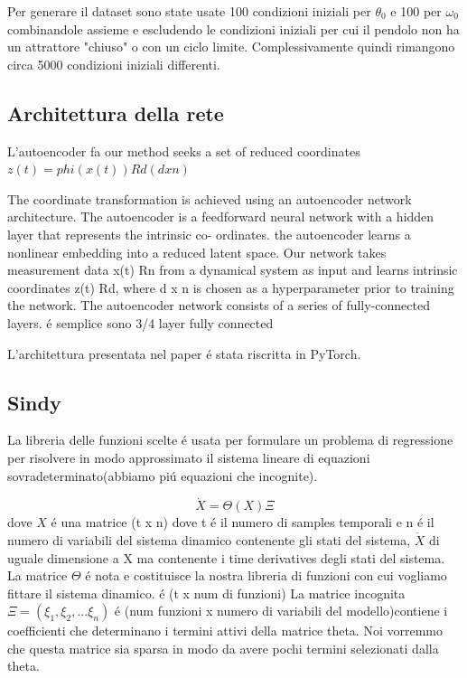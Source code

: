 \documentclass[11pt]{article}
\begin{document}
Per generare il dataset sono state usate 100 condizioni iniziali per $\theta_0$ e 100 per $\omega_0$ combinandole assieme e escludendo le condizioni iniziali per cui il pendolo non ha un attrattore "chiuso" o con un ciclo limite. Complessivamente quindi rimangono circa 5000 condizioni iniziali differenti.

\subsection{Architettura della rete}
L'autoencoder fa our method seeks a set of reduced coordinates $z(t) = phi(x(t))  Rd (d x n)$

The coordinate transformation is achieved using an autoencoder network architecture. The
autoencoder is a feedforward neural network with a hidden layer that represents the intrinsic co-
ordinates.
 the autoencoder learns a nonlinear embedding into a reduced latent space. Our
network takes measurement data x(t)  Rn from a dynamical system as input and learns intrinsic
coordinates z(t)  Rd, where d x n is chosen as a hyperparameter prior to training the network.
The autoencoder network consists of a series of fully-connected layers. 
é semplice sono 3/4 layer fully connected

L'architettura presentata nel paper é stata riscritta in PyTorch.
\subsection{Sindy}




La libreria delle funzioni scelte é usata per formulare un problema di regressione per risolvere in modo approssimato il sistema lineare di equazioni sovradeterminato(abbiamo piú equazioni che incognite).

$$\dot{X} = \Theta(X) \Xi$$
dove $X$ é una matrice (t x n) dove t é il numero di samples temporali e n é il numero di variabili del sistema dinamico contenente gli stati del sistema, $\dot{X}$ di uguale dimensione a X ma contenente i time derivatives degli stati del sistema. 
La matrice $\Theta$ é nota e costituisce la nostra libreria di funzioni con cui vogliamo fittare il sistema dinamico. é (t x num di funzioni)
La matrice incognita $\Xi =  (\xi_1,\xi_2,...\xi_n) $ é (num funzioni x numero di variabili del modello)contiene i coefficienti che determinano i termini attivi della matrice theta. Noi vorremmo che questa matrice sia sparsa in modo da avere pochi termini selezionati dalla theta.
\end{document}
